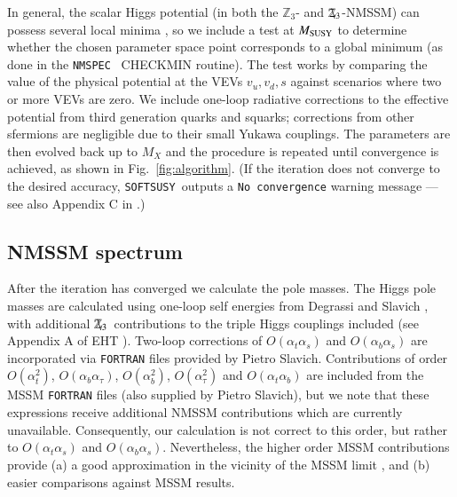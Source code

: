 \documentclass[final,3p,times,pdflatex]{elsarticle}
\def\SOFTSUSY{{\tt SOFTSUSY}}
\newcommand{\Zv}{\,\mathbf{\backslash}\mkern-11.0mu{\mathbb{Z}}_{3}} %
\def\at{\alpha_t}
\def\ab{\alpha_b}
\def\as{\alpha_s}
\def\atau{\alpha_{\tau}}
\def\oatab{O(\at\ab)}
\def\oatas{O(\at\as)}
\def\oabas{O(\ab\as)}
\def\oatq{O(\at^2)}
\def\oabq{O(\ab^2)}
\def\oatauq{O(\atau^2)}
\def\oabatau{O(\ab \atau)}
\begin{document}
In general, the scalar Higgs potential (in both the $\mathbb{Z}_3$- and 
$\Zv$-NMSSM) can possess several local minima \cite{Ellwanger:2009dp}, so we 
include a test at $M_{\rm SUSY}$ to determine whether the chosen parameter space 
point corresponds to a global minimum (as done in the {\tt NMSPEC}~\cite{Ellwanger:2006rn} 
CHECKMIN routine).  The test works by comparing the value of the physical potential at 
the VEVs $v_u,v_d,s$ against scenarios where two or more VEVs are zero.  We 
include one-loop radiative corrections to the effective potential from third 
generation quarks and squarks; corrections from other sfermions are negligible 
due to their small Yukawa couplings. The parameters are then evolved back up to $M_X$ and 
the procedure is repeated until convergence is achieved, as shown in Fig.~\ref{fig:algorithm}. 
(If the iteration does not converge to the desired accuracy, \SOFTSUSY~outputs a 
{\tt No convergence} warning message --- see also Appendix C in \cite{Allanach:2001kg}.)

\subsection{NMSSM spectrum \label{spec}}
After the iteration has converged we calculate the pole masses.  The
Higgs pole masses are calculated using one-loop self energies from Degrassi and 
Slavich \cite{Degrassi:2009yq}, with additional $\Zv$~contributions to the 
triple Higgs couplings included (see Appendix A of EHT \cite{Ellwanger:2009dp}).
Two-loop corrections \cite{Degrassi:2009yq} of $\oatas$ and $\oabas$ are 
incorporated via {\tt FORTRAN} files provided by Pietro Slavich.  Contributions 
of order $\oatq$, $\oabatau$, $\oabq$, $\oatauq$ and $\oatab$ are included from 
the MSSM {\tt FORTRAN} files (also supplied by Pietro Slavich), but we note that
 these expressions receive additional NMSSM contributions which are currently 
unavailable.  Consequently, our calculation is not correct to this order, but 
rather to $\oatas$ and $\oabas$.  Nevertheless, the higher order MSSM 
contributions provide (a) a good approximation in the vicinity of the MSSM limit
, and (b) easier comparisons against MSSM results.
\end{document}
